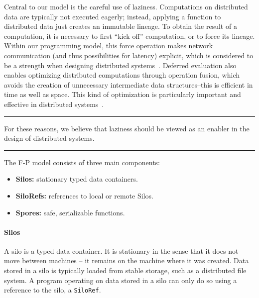 \documentclass[preprint]{sigplanconf}
\theoremstyle{definition}
\theoremstyle{definition}
\begin{document}
Central to our model is the careful use of laziness. Computations on
distributed data are typically not executed eagerly; instead, applying a
function to distributed data just creates an immutable lineage. To obtain the
result of a computation, it is necessary to first ``kick off'' computation, or
to force its lineage. Within our programming model, this force
operation makes network communication (and thus
possibilities for latency) explicit, which is considered to be a strength when
designing distributed systems~\cite{ANoteDistComp}. Deferred evaluation also
enables optimizing distributed computations through operation fusion, which
avoids the creation of unnecessary intermediate data structures--this is
efficient in time as well as space. This kind of optimization is particularly
important and effective in distributed systems~\cite{FlumeJava}.

\vspace{-3mm}
\begin{center}\noindent\rule{8cm}{0.4pt}\end{center}
\begin{displayquote}
For these reasons, we believe that laziness should be viewed as an enabler in
the design of distributed systems.
\end{displayquote}
\vspace{-4mm}
\begin{center}\noindent\rule{8cm}{0.4pt}\end{center}
\vspace{1mm}

\noindent The F-P model consists of three main components:
\begin{itemize}[noitemsep]
  \item {\bf Silos:} stationary typed data containers.
  \item {\bf SiloRefs:} references to local or remote Silos.
  \item {\bf Spores:} safe, serializable functions.
\end{itemize}
\vspace{1mm}

\paragraph{Silos}
A silo is a typed data container. It is stationary in the sense that it does
not move between machines -- it remains on the machine where it was created.
Data stored in a silo is typically loaded from stable storage, such as a
distributed file system. A program operating on data stored in a silo can only
do so using a reference to the silo, a \verb|SiloRef|.
\end{document}
